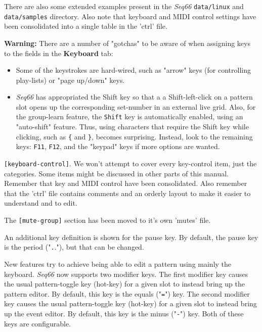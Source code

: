    There are also some extended examples present in the \textsl{Seq66}
   \texttt{data/linux} and
   \texttt{data/samples} directory.
   Also note that keyboard and MIDI control settings have been consolidated
   into a single table in the 'ctrl' file.

   \textbf{Warning:}
   There are a number of "gotchas" to be aware of when assigning keys to the
   fields in the \textbf{Keyboard} tab:

   \begin{itemize}
      \item Some of the keystrokes are hard-wired, such as 
         "arrow" keys (for controlling play-lists) or "page up/down" keys.
      \item \textsl{Seq66} has appropriated the
          Shift key so that a a Shift-left-click on a pattern
         slot opens up the corresponding set-number in an external live grid.
         Also, for the group-learn feature, the \texttt{Shift} key is 
         automatically enabled, using an "auto-shift" feature.
         Thus, using characters that require the Shift
         key while clicking, such as \texttt{\{} and \texttt{\}},
         becomes surprising.
         Instead, look to the remaining keys: \texttt{F11}, \texttt{F12},
         and the "keypad" keys if more options are wanted.
   \end{itemize}

   \texttt{[keyboard-control]}.
   We won't attempt to cover every key-control item,
   just the categories.  Some items might be discussed in other parts
   of this manual. Remember that key and MIDI control have been consolidated.
   Also remember that the 'ctrl' file contains comments and an orderly layout to
   make it easier to understand and to edit.

   The \texttt{[mute-group]} section has been moved to it's own 'mutes' file.

   An additional key definition is shown for the pause key.
   By default, the pause key is the period
   ("\texttt{.}."), but that can be changed.

   New features try to achieve being able to edit a pattern using mainly the
   keyboard.  \textsl{Seq66} now supports two modifier keys.
   The first modifier key causes the usual pattern-toggle key (hot-key) for a
   given slot to instead bring up the pattern editor.  By default, this key is
   the equals ("\texttt{=}") key.
   The second modifier key causes the usual
   pattern-toggle key (hot-key) for a given slot to instead bring up the event
   editor.  By default, this key is the minus ("\texttt{-}") key.
   Both of these keys are configurable.

